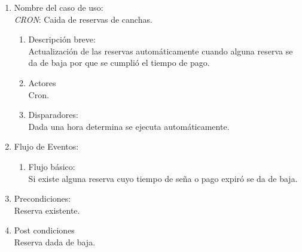 \documentclass[a4paper,11pt]{article}
\begin{document}

\begin{enumerate}

	\item Nombre del caso de uso: \\
	\emph{CRON}: Caida de reservas de canchas.

	\begin{enumerate}
		\item Descripción breve: \\
			Actualización de las reservas automáticamente cuando alguna reserva
            se da de baja por que se cumplió el tiempo de pago.
		\item Actores \\
			Cron.
	
		\item Disparadores: \\
			Dada una hora determina se ejecuta automáticamente.

	\end{enumerate}

	\item Flujo de Eventos: \\

	\begin{enumerate}
		\item Flujo básico:\\
			Si existe alguna reserva cuyo tiempo de seña o pago expiró se da de baja.
	\end{enumerate}

	\item Precondiciones: \\
        Reserva existente.

	\item Post condiciones \\
		Reserva dada de baja.

\end{enumerate}


\end{document}
